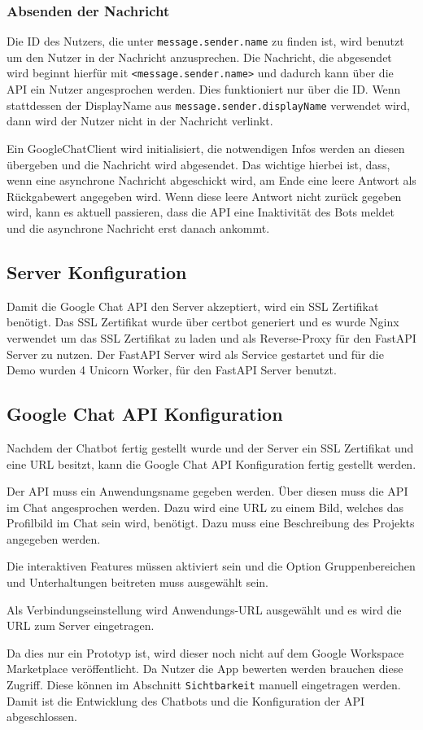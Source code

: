 \subsubsection{Absenden der Nachricht}
Die ID des Nutzers, die unter \verb|message.sender.name| zu finden ist,
wird benutzt um den Nutzer in der Nachricht anzusprechen. Die 
Nachricht, die abgesendet wird beginnt hierfür mit \verb|<message.sender.name>|
und dadurch kann über die API ein Nutzer angesprochen werden. Dies funktioniert nur
über die ID. Wenn stattdessen
der DisplayName aus \verb|message.sender.displayName| verwendet wird, dann wird der Nutzer 
nicht in der Nachricht verlinkt. \par
Ein GoogleChatClient wird initialisiert, die notwendigen Infos 
werden an diesen übergeben und die Nachricht wird abgesendet.
Das wichtige hierbei ist, dass, wenn eine asynchrone Nachricht abgeschickt wird, 
am Ende eine leere Antwort als Rückgabewert angegeben wird. Wenn diese leere Antwort nicht
zurück gegeben wird, 
kann es aktuell passieren, dass die API eine Inaktivität des Bots meldet 
und die asynchrone Nachricht erst danach ankommt. 

\subsection{Server Konfiguration}
Damit die Google Chat API den Server akzeptiert, wird ein SSL Zertifikat 
benötigt. Das SSL Zertifikat wurde über certbot generiert und es wurde Nginx verwendet um das SSL Zertifikat 
zu laden und als Reverse-Proxy für den FastAPI Server zu nutzen. 
Der FastAPI Server wird als Service gestartet und für die Demo 
wurden 4 Unicorn Worker, für den FastAPI Server benutzt. 

\subsection{Google Chat API Konfiguration}
Nachdem der Chatbot fertig gestellt wurde und der Server
ein SSL Zertifikat und eine URL besitzt, kann die Google Chat 
API Konfiguration fertig gestellt werden.\par
Der API muss ein Anwendungsname gegeben werden. Über diesen 
muss die API im Chat angesprochen werden. Dazu wird eine URL zu 
einem Bild, welches das Profilbild im Chat sein wird, benötigt.
Dazu muss eine Beschreibung des Projekts angegeben werden.\par
Die interaktiven Features müssen aktiviert sein und 
die Option Gruppenbereichen und Unterhaltungen beitreten
muss ausgewählt sein.\par
Als Verbindungseinstellung wird Anwendungs-URL ausgewählt und 
es wird die URL zum Server eingetragen.\par
Da dies nur ein Prototyp ist, wird dieser noch nicht auf 
dem Google Workspace Marketplace veröffentlicht. Da Nutzer 
die App bewerten werden brauchen diese Zugriff. Diese können 
im Abschnitt \verb|Sichtbarkeit| manuell eingetragen werden. 
Damit ist die Entwicklung des Chatbots und die Konfiguration der API 
abgeschlossen.

